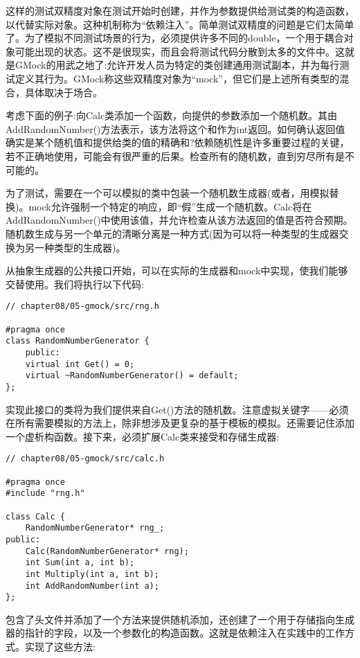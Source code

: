 这样的测试双精度对象在测试开始时创建，并作为参数提供给测试类的构造函数，以代替实际对象。这种机制称为“依赖注入”。简单测试双精度的问题是它们太简单了。为了模拟不同测试场景的行为，必须提供许多不同的double，一个用于耦合对象可能出现的状态。这不是很现实，而且会将测试代码分散到太多的文件中。这就是GMock的用武之地了:允许开发人员为特定的类创建通用测试副本，并为每行测试定义其行为。GMock称这些双精度对象为“mock”，但它们是上述所有类型的混合，具体取决于场合。

考虑下面的例子:向Calc类添加一个函数，向提供的参数添加一个随机数。其由AddRandomNumber()方法表示，该方法将这个和作为int返回。如何确认返回值确实是某个随机值和提供给类的值的精确和?依赖随机性是许多重要过程的关键，若不正确地使用，可能会有很严重的后果。检查所有的随机数，直到穷尽所有是不可能的。

为了测试，需要在一个可以模拟的类中包装一个随机数生成器(或者，用模拟替换)。mock允许强制一个特定的响应，即“假”生成一个随机数。Calc将在AddRandomNumber()中使用该值，并允许检查从该方法返回的值是否符合预期。随机数生成与另一个单元的清晰分离是一种方式(因为可以将一种类型的生成器交换为另一种类型的生成器)。

从抽象生成器的公共接口开始，可以在实际的生成器和mock中实现，使我们能够交替使用。我们将执行以下代码:

\begin{lstlisting}[style=styleCXX]
// chapter08/05-gmock/src/rng.h

#pragma once
class RandomNumberGenerator {
	public:
	virtual int Get() = 0;
	virtual ~RandomNumberGenerator() = default;
};
\end{lstlisting}

实现此接口的类将为我们提供来自Get()方法的随机数。注意虚拟关键字——必须在所有需要模拟的方法上，除非想涉及更复杂的基于模板的模拟。还需要记住添加一个虚析构函数。接下来，必须扩展Calc类来接受和存储生成器:

\begin{lstlisting}[style=styleCXX]
// chapter08/05-gmock/src/calc.h

#pragma once
#include "rng.h"

class Calc {
	RandomNumberGenerator* rng_;
public:
	Calc(RandomNumberGenerator* rng);
	int Sum(int a, int b);
	int Multiply(int a, int b);
	int AddRandomNumber(int a);
};
\end{lstlisting}

包含了头文件并添加了一个方法来提供随机添加，还创建了一个用于存储指向生成器的指针的字段，以及一个参数化的构造函数。这就是依赖注入在实践中的工作方式。实现了这些方法:


